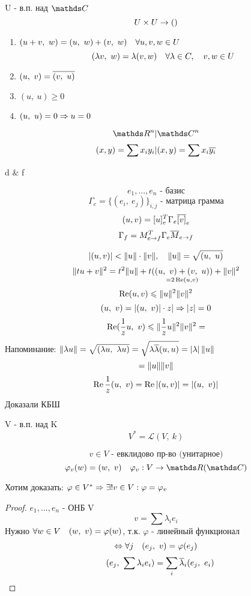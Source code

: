 \documentclass[12pt, fleqn]{article}
\begin{document}
	\tableofcontents
	\newpage
	
	
	
	
	
	

	\begin{definition}
		U - в.п. над $\CC$\\
		\[U \times U \rightarrow ()\]
		\begin{enumerate}
			\item $(u+v,\ w) = (u,\ w) + (v,\ w)\quad \forall u,v,w \in U$
			\[(\lambda v,\ w) = \lambda(v,w)\quad \forall \lambda \in C,\quad v,w \in U\]
			\item $(u,\ v) = \ol{(v,\ u)}$
			\item $(u,\ u) \geqslant 0$
			\item $(u,\ u) = 0 \Rightarrow u = 0$
		\end{enumerate}
	\end{definition}

	\begin{Example}
		\[\R^n | \CC^n\]
		\[(x,y) = \sum x_i y_i | (x,y) = \sum x_i \overline{y_i}\]
		\begin{tabular}[c|c]
			d & f
		\end{tabular}
	\end{Example}

	\[e_1,...,e_n \text{ - базис}\]
	\[\Gamma_e = \{(e_i,\ e_j)\}_{i,j} \text{ - матрица грамма}\]
	\[(u,v) = [u]_e^T \Gamma_e \overline{[v]}_e\]
	\[\Gamma_f = M_{e \rightarrow f}^T \Gamma_e \overline{M}_{e \rightarrow f}\]

	\[|(u,v)| < \lVert u \rVert \cdot \lVert v \rVert,\quad \lVert u \rVert = \sqrt{(u,\ u)}\]
	\[\lVert tu + v \rVert^2 = t^2 \lVert u \rVert + t(\underset{=2\mathop{\rm Re}\nolimits (u,v)}{(u,\ v) + (v,\ u)}) + \lVert v \rVert^2\]
	\[\mathop{\rm Re}\nolimits (u,v) \leqslant \lVert u \rVert^2 \lVert v \rVert^2\]
	\[(u,\ v) = |(u,\ v)| \cdot z |\Rightarrow |z| = 0\]
	\[\mathop{\rm Re}\nolimits (\frac{1}{z} u,\ v) \leqslant \lVert \frac{1}{z} u \rVert^2 \lVert v \rVert^2 = \]
	Напоминание: $\lVert \lambda u \rVert = \sqrt{(\lambda u,\ \lambda u)} = \sqrt{\lambda \overline{\lambda} (u,u)} =\left|\lambda\right| \lVert u \rVert$
	\[= \lVert u \rVert \lVert v \rVert\]
	\[\mathop{\rm Re}\nolimits \frac{1}{z}(u,\ v) = \mathop{\rm Re}\nolimits \left|(u,v)\right| = \left|(u,\ v)\right|\]
	Доказали КБШ

	\begin{definition}
		V - в.п. над K
		\[V^* = \mathscr{L}(V,\ k)\]
	\end{definition}
	\begin{Example}
		\[v \in V \text{ - евклидово пр-во (унитарное)}\]
		\[\varphi_v(w) = (w,\ v) \q \varphi_v: V \ra \R (\CC)\]
	\end{Example}
	Хотим доказать: $\varphi \in V^* \Rightarrow \exists! v\in V: \varphi = \varphi_v$
	\begin{proof}
		$e_1,...,e_n$ - ОНБ V
		\[v = \sum \lambda_i  e_i\]
		Нужно $\forall w \in V \quad (w,\ v) = \varphi(w)$, т.к. $\varphi$ - линейный функционал
		\[\Leftrightarrow \forall j \quad (e_j,\ v) = \varphi(e_j)\]
		\[\q (e_j,\ \sum \lambda_i e_i) = \sum_i \ol{\lambda}_i (e_j,\ e_i)\]
	\end{proof}
\end{document}
